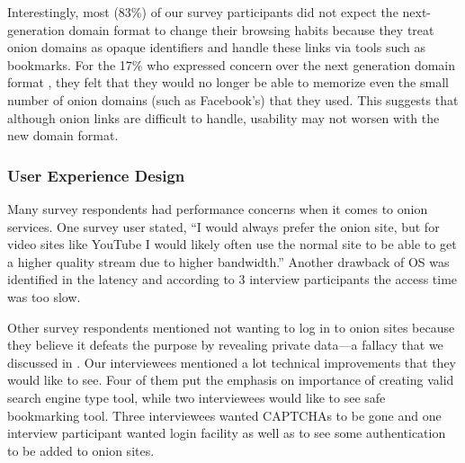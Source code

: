 Interestingly, most (83\%) of our survey participants did not expect the
next-generation domain format to change their browsing habits because they treat
onion domains as opaque identifiers and handle these links via tools such as
bookmarks.  For the 17\% who expressed concern over the next generation domain
format , they felt that they would no longer be
able to memorize even the small number of onion domains (such as Facebook's)
that they used.  This suggests that although onion links are difficult to
handle, usability may not worsen with the new domain format.

\subsubsection{User Experience Design}

Many survey respondents had performance concerns when it comes to onion
services.   One survey user stated, ``I would always
prefer the onion site, but for video sites like YouTube I would likely often use
the normal site to be able to get a higher quality stream due to higher
bandwidth.'' Another drawback of OS was identified in the latency and according
to 3 interview participants the access time was too slow. 

Other survey respondents mentioned not wanting to log in to onion sites because
they believe it defeats the purpose by revealing private data---a fallacy that
we discussed in .  Our interviewees mentioned a lot
technical improvements that they would like to see. Four of them put the
emphasis on importance of creating valid search engine type tool, while two
interviewees would like to see safe bookmarking tool.  Three interviewees wanted
CAPTCHAs to be gone and one interview participant wanted login facility as well
as to see some authentication to be added to onion sites. 

